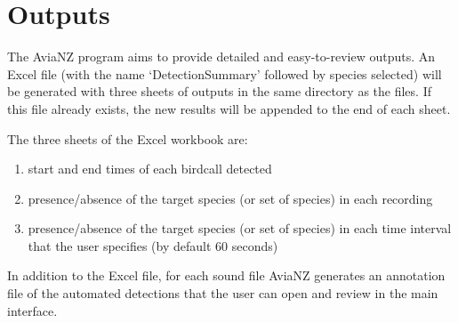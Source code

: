 \documentclass{article}
\begin{document}
\section{Outputs}
\label{sec:outputs}
The AviaNZ program aims to provide detailed and easy-to-review outputs. An Excel file (with the name `DetectionSummary' followed by species selected) will be generated with three sheets of outputs in the same directory as the files. If this file already exists, the new results will be appended to the end of each sheet. 

The three sheets of the Excel workbook are:

\begin{enumerate}
\item start and end times of each birdcall detected
\item presence/absence of the target species (or set of species) in each recording
\item  presence/absence of the target species (or set of species) in each time interval that the user specifies (by default 60 seconds)
\end{enumerate}

In addition to the Excel file, for each sound file AviaNZ generates an annotation file of the automated detections that  the user can open and review in the main interface.
\end{document}
